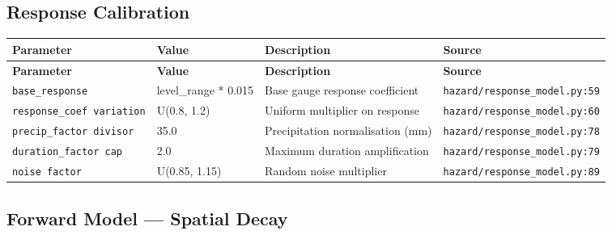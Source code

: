 \documentclass[11pt,a4paper]{article}
\begin{document}
\subsection{Response Calibration}

\begin{longtable}{p{4cm}p{4cm}p{5.5cm}p{3.5cm}}
    \toprule
    \textbf{Parameter} & \textbf{Value} & \textbf{Description} & \textbf{Source} \\
    \midrule
    \endfirsthead
    \toprule
    \textbf{Parameter} & \textbf{Value} & \textbf{Description} & \textbf{Source} \\
    \midrule
    \endhead
    \bottomrule
    \endfoot
    \texttt{base\_response} & level\_range * 0.015 & Base gauge response coefficient & {\scriptsize \texttt{hazard/response\_model.py:59}} \\
    \texttt{response\_coef variation} & U(0.8, 1.2) & Uniform multiplier on response & {\scriptsize \texttt{hazard/response\_model.py:60}} \\
    \texttt{precip\_factor divisor} & 35.0 & Precipitation normalisation (mm) & {\scriptsize \texttt{hazard/response\_model.py:78}} \\
    \texttt{duration\_factor cap} & 2.0 & Maximum duration amplification & {\scriptsize \texttt{hazard/response\_model.py:79}} \\
    \texttt{noise factor} & U(0.85, 1.15) & Random noise multiplier & {\scriptsize \texttt{hazard/response\_model.py:89}} \\
\end{longtable}

\subsection{Forward Model --- Spatial Decay}
\end{document}

